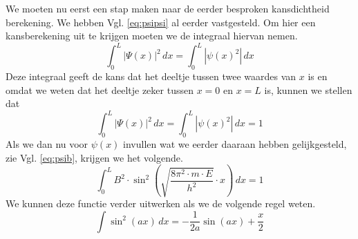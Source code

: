 \documentclass[11pt,fleqn]{book} %
\begin{document}
We moeten nu eerst een stap maken naar de eerder besproken kansdichtheid berekening. We hebben Vgl. \ref{eq:psipsi} al eerder vastgesteld.
Om hier een kansberekening uit te krijgen moeten we de integraal hiervan nemen.
\begin{displaymath}
\int_0^L {\left|\Psi(x)\right|}^2\,dx=\int_0^L \left|{\psi(x)}^2\right|\,dx
\end{displaymath}
Deze integraal geeft de kans dat het deeltje tussen twee waardes van $x$ is en omdat we weten dat het deeltje zeker tussen $x=0$ en $x=L$ is, kunnen we stellen dat
\begin{displaymath}
\int_0^L {\left|\Psi(x)\right|}^2\,dx=\int_0^L \left|{\psi(x)}^2\right|\,dx=1
\end{displaymath}
Als we dan nu voor $\psi(x)$ invullen wat we eerder daaraan hebben gelijkgesteld, zie Vgl. \ref{eq:psib}, krijgen we het volgende.
\begin{displaymath}
\int_0^L B^2\cdot\sin^2{\left(\sqrt{\frac{8\pi^2\cdot m\cdot E}{h^2}}\cdot x\right)}\,dx=1
\end{displaymath}
We kunnen deze functie verder uitwerken als we de volgende regel weten.
\begin{displaymath}
\int \sin^2{(ax)}\,dx=-\frac{1}{2a}\sin{(ax)}+\frac{x}{2}
\end{displaymath}
\end{document}
